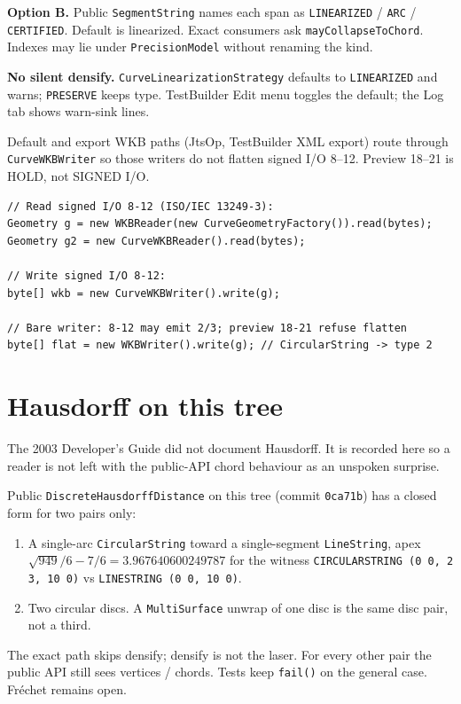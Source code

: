 \documentclass[11pt]{article}
\begin{document}
\textbf{Option B.} Public \texttt{SegmentString} names each span as
\texttt{LINEARIZED} / \texttt{ARC} / \texttt{CERTIFIED}. Default is
linearized. Exact consumers ask \texttt{mayCollapseToChord}. Indexes
may lie under \texttt{PrecisionModel} without renaming the kind.

\textbf{No silent densify.} \texttt{CurveLinearizationStrategy}
defaults to \texttt{LINEARIZED} and warns; \texttt{PRESERVE} keeps
type. TestBuilder Edit menu toggles the default; the Log tab shows
warn-sink lines.

Default and export WKB paths (JtsOp, TestBuilder XML export) route
through \texttt{CurveWKBWriter} so those writers do not flatten
signed I/O 8--12. Preview 18--21 is HOLD, not SIGNED I/O.

\begin{lstlisting}
// Read signed I/O 8-12 (ISO/IEC 13249-3):
Geometry g = new WKBReader(new CurveGeometryFactory()).read(bytes);
Geometry g2 = new CurveWKBReader().read(bytes);

// Write signed I/O 8-12:
byte[] wkb = new CurveWKBWriter().write(g);

// Bare writer: 8-12 may emit 2/3; preview 18-21 refuse flatten
byte[] flat = new WKBWriter().write(g); // CircularString -> type 2
\end{lstlisting}


\section{Hausdorff on this tree}
The 2003 Developer's Guide did not document Hausdorff. It is recorded
here so a reader is not left with the public-API chord behaviour as
an unspoken surprise.

Public \texttt{DiscreteHausdorffDistance} on this tree (commit
\texttt{0ca71b}) has a closed form for two pairs only:
\begin{enumerate}
  \item A single-arc \texttt{CircularString} toward a single-segment
        \texttt{LineString}, apex $\sqrt{949}/6 - 7/6 = 3.967640600249787$
        for the witness
        \texttt{CIRCULARSTRING (0 0, 2 3, 10 0)} vs
        \texttt{LINESTRING (0 0, 10 0)}.
  \item Two circular discs. A
        \texttt{MultiSurface} unwrap of one disc is the same disc
        pair, not a third.
\end{enumerate}
The exact path skips densify; densify is not the laser. For every
other pair the public API still sees vertices / chords. Tests keep
\texttt{fail()} on the general case. Fr\'echet remains open.
\end{document}
